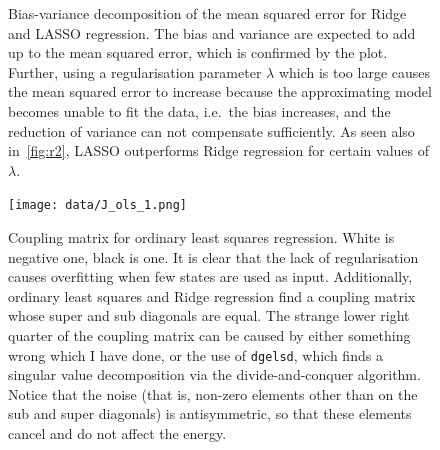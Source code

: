 \documentclass[11pt,british,a4paper]{article}
\numberwithin{equation}{section}
\begin{document}
\begin{figure}[H]
    \centering
    \caption{Bias-variance decomposition of the mean squared error for Ridge and LASSO regression. The bias and variance are expected to add up to the mean squared error, which is confirmed by the plot. Further, using a regularisation parameter \(\lambda\) which is too large causes the mean squared error to increase because the approximating model becomes unable to fit the data, i.e.\ the bias increases, and the reduction of variance can not compensate sufficiently. As seen also in~\vref{fig:r2}, LASSO outperforms Ridge regression for certain values of \(\lambda\).}
\end{figure}

\begin{figure}[H]
    \centering
    \texttt{[image: data/J\_ols\_1.png]}
    \caption{Coupling matrix for ordinary least squares regression. White is negative one, black is one. It is clear that the lack of regularisation causes overfitting when few states are used as input. Additionally, ordinary least squares and Ridge regression find a coupling matrix whose super and sub diagonals are equal. The strange lower right quarter of the coupling matrix can be caused by either something wrong which I have done, or the use of \lstinline{dgelsd}, which finds a singular value decomposition via the divide-and-conquer algorithm. Notice that the noise (that is, non-zero elements other than on the sub and super diagonals) is antisymmetric, so that these elements cancel and do not affect the energy.}
\end{figure}
\end{document}

